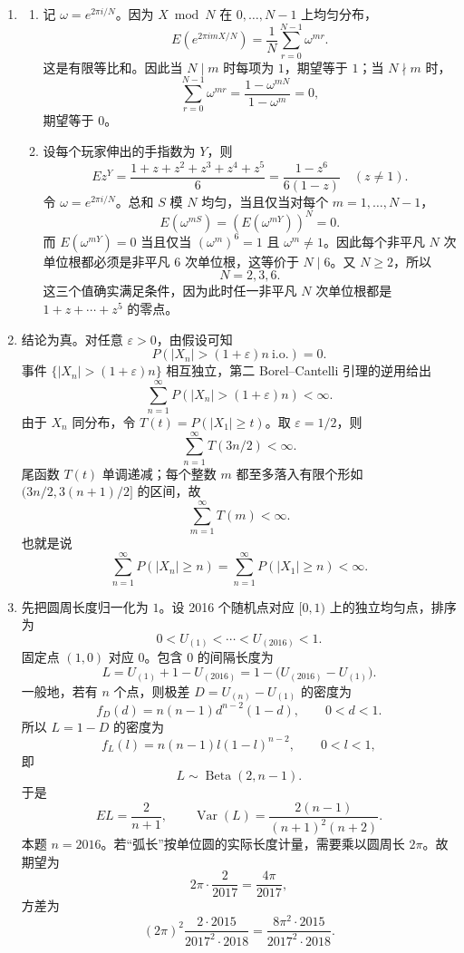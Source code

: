 \documentclass[UTF8,12pt]{ctexart}
\begin{document}
\begin{enumerate}[label=\textbf{\arabic*.},leftmargin=2.2em]
\item
\begin{enumerate}[label=\textbf{(\alph*)},leftmargin=2.4em]
\item 记 \(\omega=e^{2\pi i/N}\)。因为 \(X\bmod N\) 在 \(0,\ldots,N-1\) 上均匀分布，
\[
E(e^{2\pi i mX/N})
=\frac1N\sum_{r=0}^{N-1}\omega^{mr}.
\]
这是有限等比和。因此当 \(N\mid m\) 时每项为 \(1\)，期望等于 \(1\)；当 \(N\nmid m\) 时，
\[
\sum_{r=0}^{N-1}\omega^{mr}=\frac{1-\omega^{mN}}{1-\omega^m}=0,
\]
期望等于 \(0\)。
\item 设每个玩家伸出的手指数为 \(Y\)，则
\[
E z^Y=\frac{1+z+z^2+z^3+z^4+z^5}{6}
=\frac{1-z^6}{6(1-z)}\quad (z\ne1).
\]
令 \(\omega=e^{2\pi i/N}\)。总和 \(S\) 模 \(N\) 均匀，当且仅当对每个 \(m=1,\ldots,N-1\)，
\[
E(\omega^{mS})=\left(E(\omega^{mY})\right)^N=0.
\]
而 \(E(\omega^{mY})=0\) 当且仅当 \((\omega^m)^6=1\) 且 \(\omega^m\ne1\)。因此每个非平凡 \(N\) 次单位根都必须是非平凡 \(6\) 次单位根，这等价于 \(N\mid6\)。又 \(N\ge2\)，所以
\[
N=2,3,6.
\]
这三个值确实满足条件，因为此时任一非平凡 \(N\) 次单位根都是 \(1+z+\cdots+z^5\) 的零点。
\end{enumerate}

\item 结论为真。对任意 \(\varepsilon>0\)，由假设可知
\[
P\left(|X_n|>(1+\varepsilon)n\ \text{i.o.}\right)=0.
\]
事件 \(\{|X_n|>(1+\varepsilon)n\}\) 相互独立，第二 Borel--Cantelli 引理的逆用给出
\[
\sum_{n=1}^\infty P(|X_n|>(1+\varepsilon)n)<\infty.
\]
由于 \(X_n\) 同分布，令 \(T(t)=P(|X_1|\ge t)\)。取 \(\varepsilon=1/2\)，则
\[
\sum_{n=1}^\infty T(3n/2)<\infty.
\]
尾函数 \(T(t)\) 单调递减；每个整数 \(m\) 都至多落入有限个形如 \((3n/2,3(n+1)/2]\) 的区间，故
\[
\sum_{m=1}^\infty T(m)<\infty.
\]
也就是说
\[
\sum_{n=1}^\infty P(|X_n|\ge n)
=\sum_{n=1}^\infty P(|X_1|\ge n)<\infty.
\]

\item 先把圆周长度归一化为 \(1\)。设 2016 个随机点对应 \([0,1)\) 上的独立均匀点，排序为
\[
0<U_{(1)}<\cdots<U_{(2016)}<1.
\]
固定点 \((1,0)\) 对应 \(0\)。包含 \(0\) 的间隔长度为
\[
L=U_{(1)}+1-U_{(2016)}=1-\bigl(U_{(2016)}-U_{(1)}\bigr).
\]
一般地，若有 \(n\) 个点，则极差 \(D=U_{(n)}-U_{(1)}\) 的密度为
\[
f_D(d)=n(n-1)d^{n-2}(1-d),\qquad 0<d<1.
\]
所以 \(L=1-D\) 的密度为
\[
f_L(l)=n(n-1)l(1-l)^{n-2},\qquad 0<l<1,
\]
即
\[
L\sim \operatorname{Beta}(2,n-1).
\]
于是
\[
E L=\frac{2}{n+1},\qquad
\operatorname{Var}(L)=\frac{2(n-1)}{(n+1)^2(n+2)}.
\]
本题 \(n=2016\)。若“弧长”按单位圆的实际长度计量，需要乘以圆周长 \(2\pi\)。故期望为
\[
2\pi\cdot \frac{2}{2017}=\frac{4\pi}{2017},
\]
方差为
\[
(2\pi)^2\frac{2\cdot2015}{2017^2\cdot2018}
=\frac{8\pi^2\cdot2015}{2017^2\cdot2018}.
\]
\end{enumerate}
\end{document}
